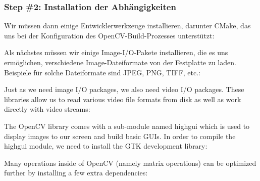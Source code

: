 \subsubsection{Step \#2: Installation der Abhängigkeiten}


\medskip

Wir müssen dann einige Entwicklerwerkzeuge installieren, darunter CMake, das uns bei der Konfiguration des OpenCV-Build-Prozesses unterstützt:

\medskip


\medskip


Als nächstes müssen wir einige Image-I/O-Pakete installieren, die es uns ermöglichen, verschiedene Image-Dateiformate von der Festplatte zu laden. Beispiele für solche Dateiformate sind JPEG, PNG, TIFF, etc.:

\medskip


\medskip

Just as we need image I/O packages, we also need video I/O packages. These libraries allow us to read various video file formats from disk as well as work directly with video streams:

\medskip



\medskip

The OpenCV library comes with a sub-module named highgui which is used to display images to our screen and build basic GUIs. In order to compile the highgui module, we need to install the GTK development library:

\medskip



\medskip

Many operations inside of OpenCV (namely matrix operations) can be optimized further by installing a few extra dependencies:\

\medskip


